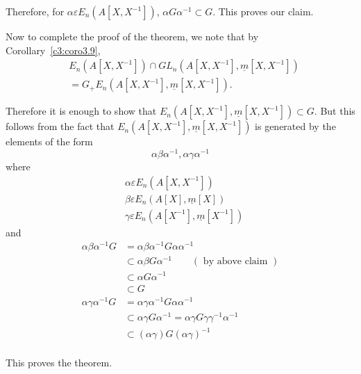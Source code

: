 \begin{Proof}
Therefore, for $\alpha\varepsilon
E_n\left(A\left[X,X^{-1}\right]\right)$, $\alpha G \alpha^{-1}\subset
G$. This proves our claim.

Now to complete the proof of the theorem, we note that by
Corollary~\ref{c3:coro3.9},
$$
\begin{aligned}
&E_n\left(A\left[X,X^{-1}\right]\right)\cap
GL_n\left(A\left[X,X^{-1}\right],\underline{m}\left[X,X^{-1}\right]\right)\\
&{}=G_+E_n\left(A\left[X,X^{-1}\right],\underline{m}\left[X,X^{-1}\right]\right).
\end{aligned}
$$

Therefore it is enough to show that
$E_n\left(A\left[X,X^{-1}\right],\underline{m}\left[X,X^{-1}\right]\right)\subset
G$. But this follows from the fact that
$E_n\left(A\left[X,X^{-1}\right],\underline{m}\left[X,X^{-1}\right]\right)$
is generated by the elements of the form
$$
\alpha\beta \alpha^{-1},\alpha\gamma\alpha^{-1}
$$
where
$$
\begin{aligned}
&\alpha \varepsilon E_n\left(A\left[X,X^{-1}\right]\right)\\
&\beta \varepsilon E_n(A[X],\underline{m}[X])\\
&\gamma\varepsilon E_n\left(A\left[X^{-1}\right],\underline{m}\left[X^{-1}\right]\right)
\end{aligned}
$$
and 
$$
\begin{aligned}
\alpha\beta \alpha^{-1} G&=\alpha\beta\alpha^{-1}G\alpha\alpha^{-1}\\
&{}\subset \alpha\beta G\alpha^{-1}\qquad (\text{ by above claim })\\
&{}\subset \alpha G\alpha^{-1}\\
&{} \subset G\\
\alpha\gamma\alpha^{-1}G&=\alpha\gamma\alpha^{-1}G\alpha\alpha^{-1}\\
&{}\subset \alpha\gamma G\alpha^{-1}=\alpha\gamma
G\gamma\gamma^{-1}\alpha^{-1}\\
&{}\subset (\alpha\gamma)G(\alpha\gamma)^{-1}\\
\end{aligned}
$$

This proves the theorem.
\enprf
\end{Proof}

